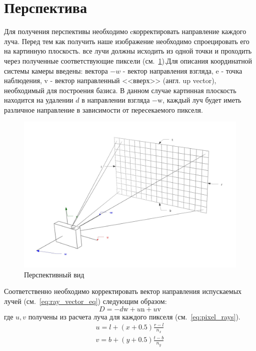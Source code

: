 \documentclass[a4paper,14pt,unknownkeysallowed]{extreport}
\begin{document}
\section{Перспектива}
Для получения перспективы необходимо cкорректировать направление каждого луча. Перед тем как получить наше изображение необходимо спроецировать его на картинную плоскость.
все лучи должны исходить из одной точки и проходить через полученные соответствующие пиксели (см.~\ref{fig:perspective_view}).Для описания координатной системы камеры введены:
вектора $-w$ - вектор направления взгляда, $\mathrm{e}$ - точка наблюдения, $\mathrm{v}$ - вектор направленный <<вверх>> (англ. up vector), необходимый для построения базиса.
В данном случае картинная плоскость находится на удалении $d$ в направлении взгляда $\mathrm{-w}$, каждый луч будет иметь различное направление в зависимости от пересекаемого пикселя.
\begin{figure}[H]
	\centering
	\includegraphics[scale=0.3]{raytracing_perspective}
	\caption{Перспективный вид}
	\label{fig:perspective_view}
\end{figure}
Соответственно необходимо корректировать вектор направления испускаемых лучей (см.~\ref{eq:ray_vector_eq}) следующим образом:
\begin{equation}
	D = -d\mathrm{w} + u\mathrm{n} + u\mathrm{v}
\end{equation}
где $u,v$ получены из расчета луча для каждого пикселя (см.~\ref{eq:pixel_rays}).
\begin{equation}
	\begin{aligned}
		u = l + (x + 0.5)\frac{r - l}{n_x}\\
		v = b + (y + 0.5)\frac{t - b}{n_y}
	\end{aligned}
	\label{eq:pixel_rays}
\end{equation}
\end{document}
